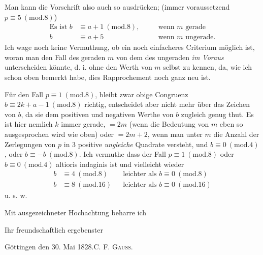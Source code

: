 \par{}Man kann die Vorschrift also auch so ausdrücken; (immer voraussetzend $p\equiv5\ (\mathrm{mod}.8)$)
\[
\begin{aligned}
\text{Es ist }b&\equiv a+1\ (\mathrm{mod}.8),&\quad&\text{wenn }m\text{ gerade}\\
b&\equiv a+5&&\text{wenn }m\text{ ungerade.}
\end{aligned}
\]
Ich wage noch keine Vermuthung, ob ein noch einfacheres Criterium möglich ist, woran man den Fall des geraden $m$ von dem des ungeraden \textit{im Voraus} unterscheiden könnte, d. i. ohne den Werth von $m$ selbst zu kennen, da, wie ich schon oben bemerkt habe, dies Rapprochement noch ganz neu ist.
\par Für den Fall $p\equiv1\ (\mathrm{mod}.8)$, bleibt zwar obige Congruenz $b\equiv2k+a-1\ (\mathrm{mod}.8)$ richtig, entscheidet aber nicht mehr über das Zeichen von $b$, da sie dem positiven und negativen Werthe von $b$ zugleich genug thut. Es ist hier nemlich $k$ immer gerade, $=2m$ (wenn die Bedeutung von $m$ eben so ausgesprochen wird wie oben) oder $=2m+2$, wenn man unter $m$ die Anzahl der Zerlegungen von $p$ in 3 positive \textit{ungleiche} Quadrate versteht, und $b\equiv0\ (\mathrm{mod}.4)$, oder $b\equiv-b\ (\mathrm{mod}.8)$. Ich vermuthe dass der Fall $p\equiv1\ (\mathrm{mod}.8)$ oder $b\equiv0\ (\mathrm{mod}.4)$ altioris indaginis ist und vielleicht wieder
\[
\begin{aligned}
b&\equiv4\ (\mathrm{mod}.8)&&\text{leichter als }b\equiv0\ (\mathrm{mod}.8)\\
b&\equiv8\ (\mathrm{mod}.16)&&\text{leichter als }b\equiv0\ (\mathrm{mod}.16)
\end{aligned}
\]
u. s. w.
\par{}Mit ausgezeichneter Hochachtung beharre ich
\par\nobreak\noindent\hfill Ihr freundschaftlich ergebenster
\par\nobreak\noindent Göttingen den 30. Mai 1828.\hfill C. F. \textsc{Gauss}.
